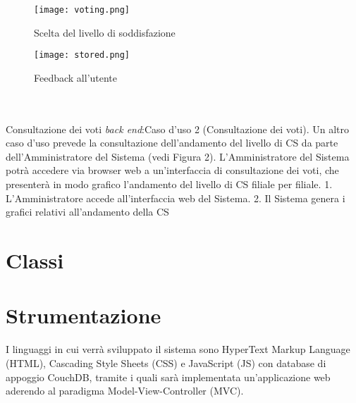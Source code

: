 \begin{itemize}
\begin{figure}[!h]
\begin{center}
        \label{fig:comment}
    \end{center}
  \end{figure}
   \begin{figure}[!h]
    \begin{center}
        \texttt{[image: voting.png]}
        \caption{Scelta del livello di soddisfazione}
        \label{fig:voting}
    \end{center}
  \end{figure}
  \begin{figure}[!h]
    \begin{center}
        \texttt{[image: stored.png]}
        \caption{Feedback all'utente}
        \label{fig:stored}
    \end{center}
  \end{figure}
\end{itemize}
\\\\
Consultazione dei voti \emph{back end}:Caso d’uso 2 (Consultazione dei voti). Un altro caso d’uso prevede la consultazione dell’andamento del livello di CS da parte
dell’Amministratore del Sistema (vedi Figura 2). L’Amministratore del Sistema potrà accedere via browser web a un’interfaccia
di consultazione dei voti, che presenterà in modo graﬁco l’andamento del livello di CS ﬁliale per ﬁliale.
1. L’Amministratore accede all’interfaccia web del Sistema.
2. Il Sistema genera i graﬁci relativi all’andamento della CS

\section{Classi}

\section{Strumentazione}
I linguaggi in cui verrà sviluppato il sistema sono HyperText Markup Language (HTML), Cascading Style Sheets (CSS) e
JavaScript (JS) con database di appoggio CouchDB, tramite i quali sarà implementata un’applicazione web aderendo al paradigma Model-View-Controller (MVC).